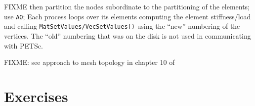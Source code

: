 FIXME then partition the nodes subordinate to the partitioning of the elements; use \texttt{AO}; Each process loops over its elements computing the element stiffness/load and calling \texttt{MatSetValues/VecSetValues()} using the ``new'' numbering of the vertices.  The ``old'' numbering that was on the disk is not used in communicating with PETSc.

FIXME: see approach to mesh topology in chapter 10 of \citep{Loggetal2012}



\section{Exercises}

